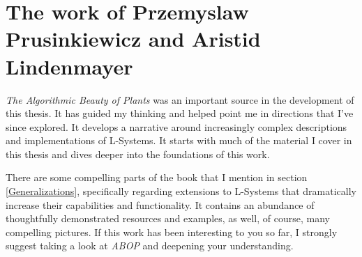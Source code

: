 \documentclass[12pt,twoside]{reedthesis}
\begin{document}
\section{The work of Przemyslaw Prusinkiewicz and Aristid Lindenmayer}
	
	\textit{The Algorithmic Beauty of Plants} was an important source in the development of this thesis. It has guided my thinking and helped point me in directions that I've since explored. It develops a narrative around increasingly complex descriptions and implementations of L-Systems. It starts with much of the material I cover in this thesis and dives deeper into the foundations of this work.
	
	There are some compelling parts of the book that I mention in section \ref{Generalizations}, specifically regarding extensions to L-Systems that dramatically increase their capabilities and functionality. It contains an abundance of thoughtfully demonstrated resources and examples, as well, of course, many compelling pictures. If this work has been interesting to you so far, I strongly suggest taking a look at \textit{ABOP} and deepening your understanding.
	
\end{document}
